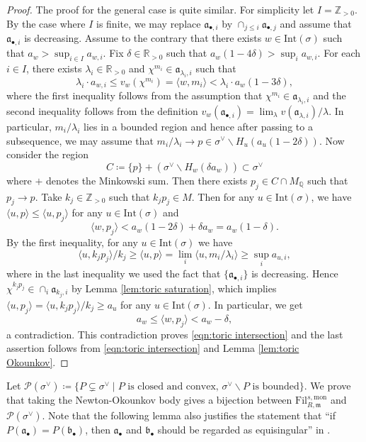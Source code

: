 \documentclass[11pt, leqno]{amsart}%
\theoremstyle{plain}
\theoremstyle{definition}
\theoremstyle{remark}
\newcommand{\cP}{\mathcal{P}}
\newcommand{\bQ}{\mathbb{Q}}
\newcommand{\bR}{\mathbb{R}}
\newcommand{\bZ}{\mathbb{Z}}
\newcommand{\fa}{\mathfrak{a}}
\newcommand{\fb}{\mathfrak{b}}
\newcommand{\fm}{\mathfrak{m}}
\newcommand{\Int}{\mathrm{Int}}
\newcommand{\Fil}{\mathrm{Fil}}
\numberwithin{equation}{section}
\begin{document}
\begin{proof}
    The proof for the general case is quite similar. For simplicity let $I=\bZ_{>0}$. By the case where $I$ is finite, we may replace $\fa_{\bullet,i}$ by $\cap_{j\le i}\fa_{\bullet,j}$ and assume that $\fa_{\bullet,i}$ is decreasing. Assume to the contrary that there exists $w\in\Int(\sigma)$ such that $a_w>\sup_{i\in I} a_{w,i}$. Fix $\delta\in\bR_{>0}$ such that $a_w(1-4\delta)>\sup_i a_{w,i}$. For each $i\in I$, there exists $\lambda_i\in\bR_{>0}$ and $\chi^{m_i}\in\fa_{\lambda_i,i}$ such that 
    \[
        \lambda_i\cdot a_{w,i}\le v_w(\chi^{m_i})=\langle w,m_i \rangle <\lambda_i\cdot a_w(1-3\delta),
    \]
    where the first inequality follows from the assumption that $\chi^{m_i}\in\fa_{\lambda_i,i}$ and the second inequality follows from the definition $v_w(\fa_{\bullet,i})=\lim_\lambda v(\fa_{\lambda,i})/\lambda$. In particular, $m_i/\lambda_i$ lies in a bounded region and hence after passing to a subsequence, we may assume that $m_i/\lambda_i\to p\in\sigma^\vee\backslash H_u(a_u(1-2\delta))$. Now consider the region
    \[
        C\coloneqq\{p\}+(\sigma^\vee\backslash H_w(\delta a_w))\subset \sigma^\vee
    \]
    where $+$ denotes the Minkowski sum. Then there exists $p_j\in C\cap M_\bQ$ such that $p_j\to p$. Take $k_j\in\bZ_{>0}$ such that $k_jp_j\in M$. Then for any $u\in \Int(\sigma)$, we have
    $\langle u,p \rangle \le \langle u,p_j \rangle$
    for any $u\in\Int(\sigma)$ and
    \begin{equation}\label{eqn:toric upper bound}
        \langle w,p_j \rangle< a_w(1-2\delta)+\delta a_w=a_w(1-\delta).
    \end{equation}
    By the first inequality, for any $u\in\Int(\sigma)$ we have 
    \[
        \langle u,k_jp_j \rangle/k_j\ge \langle u,p \rangle=\lim_i \langle u,m_i/\lambda_i \rangle \ge \sup_i a_{u,i},
    \]
    where in the last inequality we used the fact that $\{\fa_{\bullet,i}\}$ is decreasing. Hence $\chi^{k_jp_j}\in\cap_i\fa_{k_j,i}$ by Lemma \ref{lem:toric saturation}, which implies $\langle u,p_j \rangle = \langle u,k_jp_j \rangle/k_j\ge a_u$ for any $u\in\Int(\sigma)$. In particular, we get
    \[
        a_w\le \langle w,p_j\rangle < a_w-\delta,
    \]
    a contradiction. This contradiction proves \eqref{eqn:toric intersection} and the last assertion follows from \eqref{eqn:toric intersection} and Lemma \ref{lem:toric Okounkov}.
\end{proof}

Let $\cP(\sigma^\vee)\coloneqq \{P\subsetneq \sigma^\vee \mid P \text{ is closed and convex, }\sigma^\vee\backslash P \text{ is bounded} \}$. We prove that taking the Newton-Okounkov body gives a bijection between $\Fil^{s,\mathrm{mon}}_{R,\fm}$ and $\cP(\sigma^\vee)$. Note that the following lemma also justifies the statement that ``if $P(\fa_\bullet)=P(\fb_\bullet)$, then $\fa_\bullet$ and $\fb_\bullet$ should be regarded as equisingular'' in \cite[Section 8]{JM12}.
\end{document}
